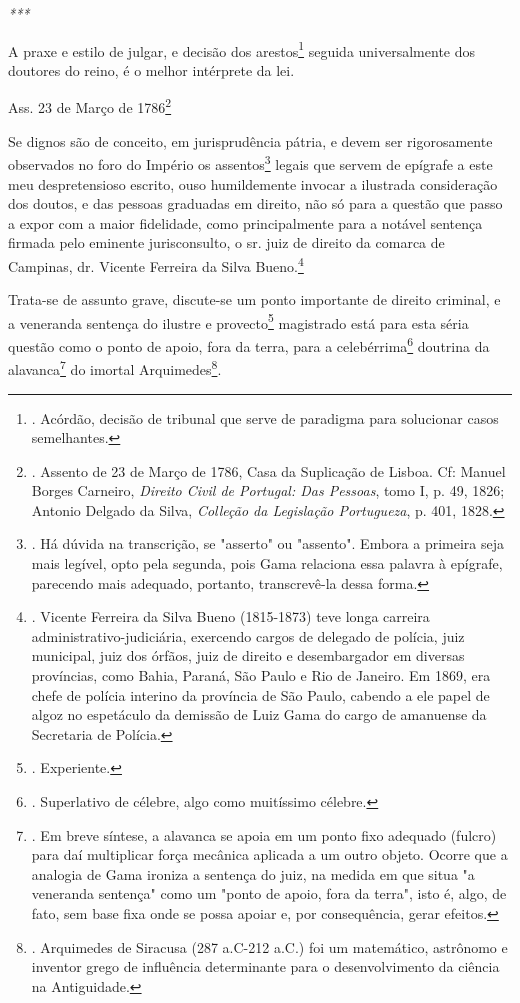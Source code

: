 \emph{***}

A praxe e estilo de julgar, e decisão dos arestos\footnote{. Acórdão,
  decisão de tribunal que serve de paradigma para solucionar casos
  semelhantes.} seguida universalmente dos doutores do reino, é o melhor
intérprete da lei.

Ass. 23 de Março de 1786\footnote{. Assento de 23 de Março de 1786, Casa
  da Suplicação de Lisboa. Cf: Manuel Borges Carneiro, \emph{Direito
  Civil de Portugal: Das Pessoas}, tomo I, p. 49, 1826; Antonio Delgado
  da Silva, \emph{Colleção da Legislação Portugueza}, p. 401, 1828.}

Se dignos são de conceito, em jurisprudência pátria, e devem ser
rigorosamente observados no foro do Império os assentos\footnote{. Há
  dúvida na transcrição, se "asserto" ou "assento". Embora a primeira
  seja mais legível, opto pela segunda, pois Gama relaciona essa palavra
  à epígrafe, parecendo mais adequado, portanto, transcrevê-la dessa
  forma.} legais que servem de epígrafe a este meu despretensioso
escrito, ouso humildemente invocar a ilustrada consideração dos doutos,
e das pessoas graduadas em direito, não só para a questão que passo a
expor com a maior fidelidade, como principalmente para a notável
sentença firmada pelo eminente jurisconsulto, o sr. juiz de direito da
comarca de Campinas, dr. Vicente Ferreira da Silva Bueno.\footnote{.
  Vicente Ferreira da Silva Bueno (1815-1873) teve longa carreira
  administrativo-judiciária, exercendo cargos de delegado de polícia,
  juiz municipal, juiz dos órfãos, juiz de direito e desembargador em
  diversas províncias, como Bahia, Paraná, São Paulo e Rio de Janeiro.
  Em 1869, era chefe de polícia interino da província de São Paulo,
  cabendo a ele papel de algoz no espetáculo da demissão de Luiz Gama do
  cargo de amanuense da Secretaria de Polícia.}

Trata-se de assunto grave, discute-se um ponto importante de direito
criminal, e a veneranda sentença do ilustre e provecto\footnote{.
  Experiente.} magistrado está para esta séria questão como o ponto de
apoio, fora da terra, para a celebérrima\footnote{. Superlativo de
  célebre, algo como muitíssimo célebre.} doutrina da alavanca\footnote{.
  Em breve síntese, a alavanca se apoia em um ponto fixo adequado
  (fulcro) para daí multiplicar força mecânica aplicada a um outro
  objeto. Ocorre que a analogia de Gama ironiza a sentença do juiz, na
  medida em que situa "a veneranda sentença" como um "ponto de apoio,
  fora da terra", isto é, algo, de fato, sem base fixa onde se possa
  apoiar e, por consequência, gerar efeitos.} do imortal
Arquimedes\footnote{. Arquimedes de Siracusa (287 a.C-212 a.C.) foi um
  matemático, astrônomo e inventor grego de influência determinante para
  o desenvolvimento da ciência na Antiguidade.}.

